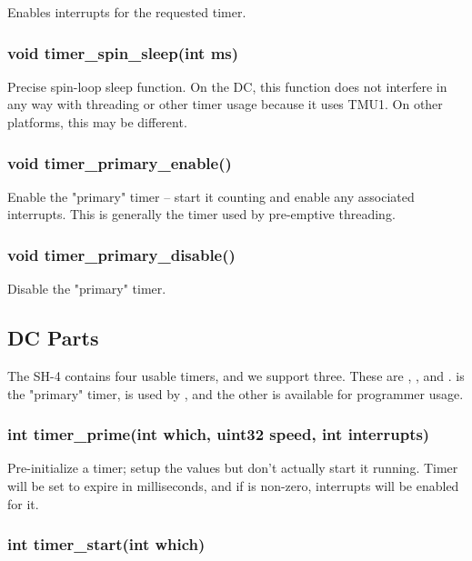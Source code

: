 \documentclass[english]{report}
\begin{document}
Enables interrupts for the requested timer.

\subsubsection{void timer\_spin\_sleep(int ms)}

Precise spin-loop sleep function. On the DC, this function does
not interfere in any way with threading or other timer usage because
it uses TMU1. On other platforms, this may be different.

\subsubsection{void timer\_primary\_enable()}

Enable the "primary" timer -- start it counting and enable any
associated interrupts. This is generally the timer used by
pre-emptive threading.

\subsubsection{void timer\_primary\_disable()}

Disable the "primary" timer.


\subsection{DC Parts}

The SH-4 contains four usable timers, and we support three. These are
, , and . 
is the "primary" timer,  is used by ,
and the other is available for programmer usage.

\subsubsection{int timer\_prime(int which, uint32 speed, int interrupts)}

Pre-initialize a timer; setup the values but don't actually start it running.
Timer  will be set to expire in  milliseconds,
and if  is non-zero, interrupts will be enabled for it.

\subsubsection{int timer\_start(int which)}
\end{document}
